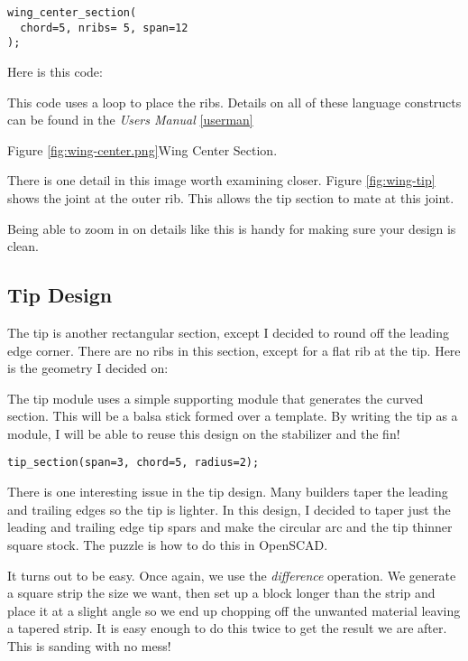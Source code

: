 \begin{lstlisting}
wing_center_section(
  chord=5, nribs= 5, span=12
);
\end{lstlisting}

Here is this code:


This code uses a loop to place the ribs. Details on all of these language
constructs can be found in the {\it Users Manual} \ref{userman}

Figure \ref{fig:wing-center.png}{Wing Center Section}.


There is one detail in this image worth examining closer. Figure
\ref{fig:wing-tip} shows the joint at the outer rib. This allows the tip section
to mate at this joint.


Being able to zoom in on details like this is handy for making sure your design
is clean.

\subsection*{Tip Design}

The tip is another rectangular section, except I decided to round off the
leading edge corner. There are no ribs in this section, except for a flat rib
at the tip. Here is the geometry I decided on:


The tip module uses a simple supporting module that generates the curved section.
This will be a balsa stick formed over a template.  By writing the tip as a
module, I will be able to reuse this design on the stabilizer and the fin!

\begin{lstlisting}
tip_section(span=3, chord=5, radius=2);
\end{lstlisting}

There is one interesting issue in the tip design. Many builders taper the
leading and trailing edges so the tip is lighter. In this design, I decided to
taper just the leading and trailing edge tip spars and make the circular arc
and the tip thinner square stock. The puzzle is how to do this in OpenSCAD.

It turns out to be easy. Once again, we use the {\it difference} operation. We
generate a square strip the size we want, then set up a block longer than the
strip and place it at a slight angle so we end up chopping off the unwanted
material leaving a tapered strip. It is easy enough to do this twice to get the
result we are after. This is sanding with no mess!

